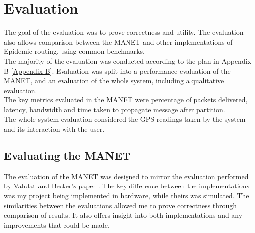 \documentclass[12pt,a4paper]{report}
\newcommand{\newchapter}[2]{
    \setcounter{chapter}{#1}
    \setcounter{section}{0}
    \chapter*{#2}
    \addcontentsline{toc}{chapter}{#1 #2}
}
\begin{document}
\newchapter{4}{Evaluation}
\setcounter{figure}{0}
The goal of the evaluation was to prove correctness and utility. The evaluation also allows comparison between the MANET and other implementations of Epidemic routing, using common benchmarks. \\
The majority of the evaluation was conducted according to the plan in Appendix B [\hyperref[appendixB]{Appendix B}]. Evaluation was split into a performance evaluation of the MANET, and an evaluation of the whole system, including a qualitative evaluation. \\
The key metrics evaluated in the MANET were percentage of packets delivered, latency, bandwidth and time taken to propagate message after partition. \\
The whole system evaluation considered the GPS readings taken by the system and its interaction with the user.\\ 

\section{Evaluating the MANET}
The evaluation of the MANET was designed to mirror the evaluation performed by Vahdat and Becker's paper \cite{epidemic}. The key difference between the implementations was my project being implemented in hardware, while theirs was simulated. The similarities between the evaluations allowed me to prove correctness through comparison of results. It also offers insight into both implementations and any improvements that could be made. \\
\end{document}
